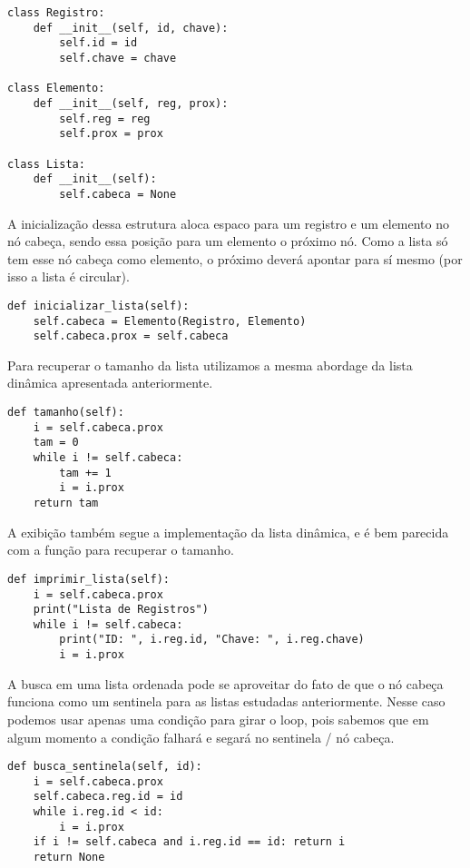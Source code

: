 \documentclass[a4paper, twocolumn]{article}
\theoremstyle{definition}
\begin{document}
\begin{lstlisting}[label=lista_ligada_circ_estrutura, caption= Lista Ligada circular (estrutura)]
class Registro:
    def __init__(self, id, chave):
        self.id = id
        self.chave = chave

class Elemento:
    def __init__(self, reg, prox):
        self.reg = reg
        self.prox = prox

class Lista:
    def __init__(self):
        self.cabeca = None
\end{lstlisting}

A inicialização dessa estrutura aloca espaco para um registro e um elemento no nó cabeça, sendo essa posição para um elemento o próximo nó. Como a lista só tem esse nó cabeça como elemento, o próximo deverá apontar para sí mesmo (por isso a lista é circular).

\begin{lstlisting}[label=lista_ligada_circ_inicializar, caption= Lista Ligada circular (inicialização)]
def inicializar_lista(self):
    self.cabeca = Elemento(Registro, Elemento)
    self.cabeca.prox = self.cabeca
\end{lstlisting}

Para recuperar o tamanho da lista utilizamos a mesma abordage da lista dinâmica apresentada anteriormente.
\begin{lstlisting}[label=lista_ligada_circ_tamanho, caption= Lista Ligada circular (tamanho)]
def tamanho(self):
    i = self.cabeca.prox
    tam = 0
    while i != self.cabeca:
        tam += 1
        i = i.prox
    return tam
\end{lstlisting}

A exibição também segue a implementação da lista dinâmica, e é bem parecida com a função para recuperar o tamanho.
\begin{lstlisting}[label=lista_ligada_circ_exibir, caption= Lista Ligada circular (exibição)]
def imprimir_lista(self):
    i = self.cabeca.prox
    print("Lista de Registros")
    while i != self.cabeca:
        print("ID: ", i.reg.id, "Chave: ", i.reg.chave)
        i = i.prox
\end{lstlisting}

A busca em uma lista ordenada pode se aproveitar do fato de que o nó cabeça funciona como um sentinela para as listas estudadas anteriormente. Nesse caso podemos usar apenas uma condição para girar o loop, pois sabemos que em algum momento a condição falhará e segará no sentinela / nó cabeça.
\begin{lstlisting}[label=lista_ligada_circ_busca, caption= Lista Ligada circular (busca)]
def busca_sentinela(self, id):
    i = self.cabeca.prox
    self.cabeca.reg.id = id
    while i.reg.id < id:
        i = i.prox
    if i != self.cabeca and i.reg.id == id: return i
    return None
\end{lstlisting}
\end{document}
